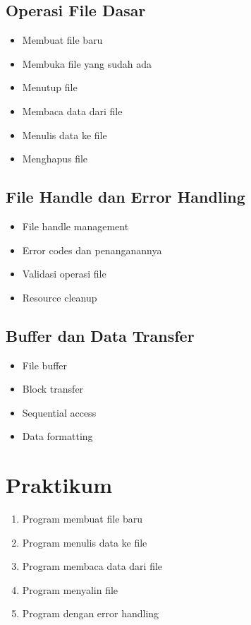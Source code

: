 \subsection{Operasi File Dasar}
\begin{itemize}
\item Membuat file baru
\item Membuka file yang sudah ada
\item Menutup file
\item Membaca data dari file
\item Menulis data ke file
\item Menghapus file
\end{itemize}

\subsection{File Handle dan Error Handling}
\begin{itemize}
\item File handle management
\item Error codes dan penanganannya
\item Validasi operasi file
\item Resource cleanup
\end{itemize}

\subsection{Buffer dan Data Transfer}
\begin{itemize}
\item File buffer
\item Block transfer
\item Sequential access
\item Data formatting
\end{itemize}

\section{Praktikum}
\begin{enumerate}
\item Program membuat file baru
\item Program menulis data ke file
\item Program membaca data dari file
\item Program menyalin file
\item Program dengan error handling
\end{enumerate}

